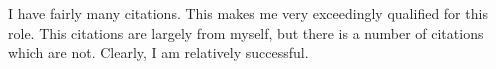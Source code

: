 \documentclass{article}
\begin{document}
I have fairly many citations. 
This makes me very exceedingly qualified for this role. 
This citations are largely from myself, but there is a number of citations which are not. 
Clearly, I am relatively successful. 
\end{document}
